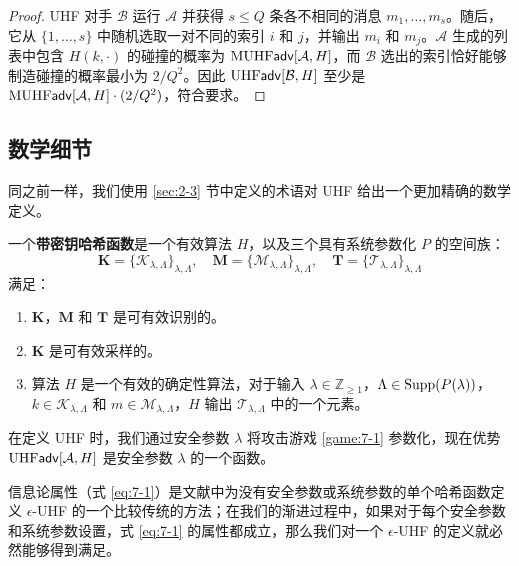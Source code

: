 \begin{proof}
UHF 对手 $\mathcal{B}$ 运行 $\mathcal{A}$ 并获得 $s\leq Q$ 条各不相同的消息 $m_1,\dots,m_s$。随后，它从 $\{1,\dots,s\}$ 中随机选取一对不同的索引 $i$ 和 $j$，并输出 $m_i$ 和 $m_j$。$\mathcal{A}$ 生成的列表中包含 $H(k,\cdot)$ 的碰撞的概率为 ${\rm MUHF}\mathsf{adv}[\mathcal{A},H]$，而 $\mathcal{B}$ 选出的索引恰好能够制造碰撞的概率最小为 $2/Q^2$。因此 ${\rm UHF}\mathsf{adv}[\mathcal{B},H]$ 至少是 ${\rm MUHF}\mathsf{adv}[\mathcal{A},H]\cdot{(2/Q^2)}$，符合要求。
\end{proof}

\subsection{数学细节}\label{subsec:7-1-2}

同之前一样，我们使用 \ref{sec:2-3} 节中定义的术语对 UHF 给出一个更加精确的数学定义。

\begin{definition}[带密钥哈希函数]\label{def:7-4}
一个\textbf{带密钥哈希函数}是一个有效算法 $H$，以及三个具有系统参数化 $P$ 的空间族：
\[
\mathbf{K}=\{\mathcal{K}_{\lambda,\Lambda}\}_{\lambda,\Lambda},\quad
\mathbf{M}=\{\mathcal{M}_{\lambda,\Lambda}\}_{\lambda,\Lambda},\quad
\mathbf{T}=\{\mathcal{T}_{\lambda,\Lambda}\}_{\lambda,\Lambda}
\]
满足：
\begin{enumerate}
	\item $\mathbf{K}$，$\mathbf{M}$ 和 $\mathbf{T}$ 是可有效识别的。
	\item $\mathbf{K}$ 是可有效采样的。
	\item 算法 $H$ 是一个有效的确定性算法，对于输入 $\lambda\in\mathbb{Z}_{\geq1}$，$\Lambda\in{\rm Supp}(P(\lambda))$，$k\in\mathcal{K}_{\lambda,\Lambda}$ 和 $m\in\mathcal{M}_{\lambda,\Lambda}$，$H$ 输出 $\mathcal{T}_{\lambda,\Lambda}$ 中的一个元素。
\end{enumerate}
\end{definition}

在定义 UHF 时，我们通过安全参数 $\lambda$ 将攻击游戏 \ref{game:7-1} 参数化，现在优势 ${\rm UHF}\mathsf{adv}[\mathcal{A},H]$ 是安全参数 $\lambda$ 的一个函数。

信息论属性（式 \ref{eq:7-1}）是文献中为没有安全参数或系统参数的单个哈希函数定义 $\epsilon$-UHF 的一个比较传统的方法；在我们的渐进过程中，如果对于每个安全参数和系统参数设置，式 \ref{eq:7-1} 的属性都成立，那么我们对一个 $\epsilon$-UHF 的定义就必然能够得到满足。
